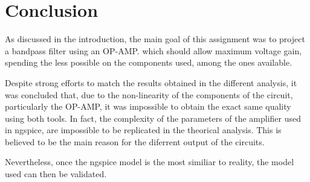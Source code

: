 \pagebreak
\section{Conclusion}
\label{con}

\par As discussed in the introduction, the main goal of this assignment was to project a bandpass filter using an OP-AMP. which should  allow maximum voltage gain, spending the less possible on the components used, among the ones available.

\par Despite strong efforts to match the results obtained in the different analysis, it was concluded that, due to the non-linearity of the components of the circuit, particularly the OP-AMP, it was impossible to obtain the exact same quality using both tools. In fact, the complexity of the parameters of the amplifier used in ngspice, are impossible to be replicated in the theorical analysis. This is believed to be the main reason for the diferrent output of the circuits.

\par Nevertheless, once the ngspice model is the most similiar to reality, the model used can then be validated.

